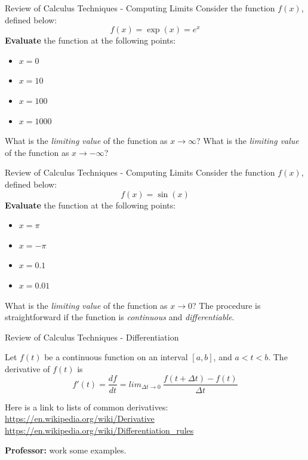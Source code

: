 \documentclass{beamer}
\begin{document}
\begin{frame}{Review of Calculus Techniques - Computing Limits}
\small
Consider the function $f(x)$, defined below:
\begin{equation}
f(x) = \exp(x) = e^x
\end{equation}
\textbf{Evaluate} the function at the following points:
\begin{itemize}
\item $x = 0$
\item $x = 10$
\item $x = 100$
\item $x = 1000$
\end{itemize}
What is the \textit{limiting value} of the function as $x \to \infty$?  What is the \textit{limiting value} of the function as $x \to -\infty$?
\end{frame}

\begin{frame}{Review of Calculus Techniques - Computing Limits}
\small
Consider the function $f(x)$, defined below:
\begin{equation}
f(x) = \sin(x)
\end{equation}
\textbf{Evaluate} the function at the following points:
\begin{itemize}
\item $x = \pi$
\item $x = -\pi$
\item $x = 0.1$
\item $x = 0.01$
\end{itemize}
What is the \textit{limiting value} of the function as $x \to 0$?  The procedure is straightforward if the function is \textit{continuous} and \textit{differentiable}.
\end{frame}

\begin{frame}{Review of Calculus Techniques - Differentiation}
\small
\begin{tcolorbox}[colback=white,colframe=gray,title=Derivative of a Function]
Let $f(t)$ be a continuous function on an interval $[a,b]$, and $a<t<b$.  The derivative of $f(t)$ is
\begin{equation}
f'(t) = \frac{df}{dt} = lim_{\Delta t \to 0} ~ \frac{f(t+\Delta t) - f(t)}{\Delta t}
\end{equation}
\end{tcolorbox}
\begin{tcolorbox}[colback=white,colframe=gray,title=List of Common Derivatives]
Here is a link to lists of common derivatives:
\url{https://en.wikipedia.org/wiki/Derivative} \\
\url{https://en.wikipedia.org/wiki/Differentiation_rules}
\end{tcolorbox}
\textbf{Professor:} work some examples.
\end{frame}
\end{document}
